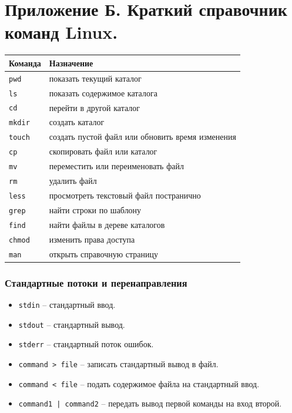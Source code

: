 \chapter{Приложение Б. Краткий справочник команд Linux.}

\begin{center}
\begin{tabular}{l|p{9cm}}
Команда & Назначение \\
\hline
\texttt{pwd} & показать текущий каталог \\
\texttt{ls} & показать содержимое каталога \\
\texttt{cd} & перейти в другой каталог \\
\texttt{mkdir} & создать каталог \\
\texttt{touch} & создать пустой файл или обновить время изменения \\
\texttt{cp} & скопировать файл или каталог \\
\texttt{mv} & переместить или переименовать файл \\
\texttt{rm} & удалить файл \\
\texttt{less} & просмотреть текстовый файл постранично \\
\texttt{grep} & найти строки по шаблону \\
\texttt{find} & найти файлы в дереве каталогов \\
\texttt{chmod} & изменить права доступа \\
\texttt{man} & открыть справочную страницу \\
\end{tabular}
\end{center}

\subsection*{Стандартные потоки и перенаправления}
\begin{itemize}
    \item \texttt{stdin} -- стандартный ввод.
    \item \texttt{stdout} -- стандартный вывод.
    \item \texttt{stderr} -- стандартный поток ошибок.
    \item \texttt{command > file} -- записать стандартный вывод в файл.
    \item \texttt{command < file} -- подать содержимое файла на стандартный ввод.
    \item \texttt{command1 | command2} -- передать вывод первой команды на вход второй.
\end{itemize}

